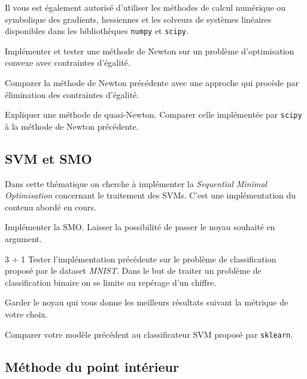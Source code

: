 \documentclass[11pt, a4paper]{article}
\begin{document}
Il vous est également autorisé d'utiliser les méthodes de calcul
numérique ou symbolique des gradients, hessiennes et les solveurs de
systèmes linéaires disponibles dans les bibliothèques \texttt{numpy}
et \texttt{scipy}.

\begin{question}{4}
  Implémenter et tester une méthode de Newton sur un problème
  d'optimisation convexe avec contraintes d'égalité.
\end{question}

\begin{question}{3}
  Comparer la méthode de Newton précédente avec une approche qui
  procède par élimination des contraintes d'égalité.
\end{question}

\begin{question}{3}
  Expliquer une méthode de quasi-Newton. Comparer celle implémentée par
  \texttt{scipy} à la méthode de Newton précédente.
\end{question}

\subsection{SVM et SMO}

Dans cette thématique on cherche à implémenter la \emph{Sequential
  Minimal Optimisation} concernant le traitement des SVMs. C'est une
implémentation du contenu abordé en cours.

\begin{question}{5}
  Implémenter la SMO. Laisser la possibilité de passer le noyau
  souhaité en argument.
\end{question}

\begin{question}{3 + 1}
  Tester l'implémentation précédente sur le problème de classification
  proposé par le dataset \emph{MNIST}. Dans le but de traiter un
  problème de classification binaire on se limite au repérage d'un
  chiffre.

  \noindent Garder le noyau qui vous donne les meilleurs résultats
  suivant la métrique de votre choix.
\end{question}

\begin{question}{2}
  Comparer votre modèle précédent au classificateur SVM proposé par
  \texttt{sklearn}.
\end{question}

\subsection{Méthode du point intérieur}
\end{document}
